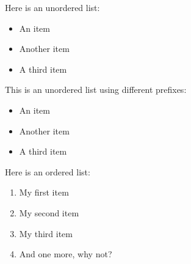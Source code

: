 \documentclass[10pt]{extarticle}
\date{}
\begin{document}

Here is an unordered list:

\begin{itemize}
	\item An item
	\item Another item
	\item A third item
\end{itemize}

This is an unordered list using different prefixes:

\begin{itemize}
	\item An item
	\item Another item
	\item A third item
\end{itemize}

Here is an ordered list:

\begin{enumerate}
	\item My first item
	\item My second item
	\item My third item
	\item And one more, why not?
\end{enumerate}

\end{document}
